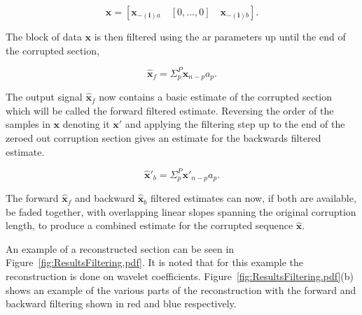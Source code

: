 \begin{equation}\label{eq:RestBasicModelFilterZeros}
\boldsymbol{x} = \left[ \boldsymbol{x}_{\boldsymbol{-(i)}a}\quad \left[0,\ldots,0\right] \quad\boldsymbol{x}_{\boldsymbol{-(i)}b} \right].
\end{equation}

The block of data $\boldsymbol{x}$ is then filtered using the \gls{ar} parameters up until the end of the corrupted section,

\begin{equation}\label{eq:RestBasicModelFilterEQ}
\boldsymbol{\hat{x}}_f = \Sigma_p^P \boldsymbol{x}_{n-p}a_p.
\end{equation}

The output signal $\boldsymbol{\hat{x}}_f$ now contains a basic estimate of the corrupted section which will be called the forward filtered estimate. Reversing the order of the samples in $\boldsymbol{x}$ denoting it $\boldsymbol{x'}$ and applying the filtering step up to the end of the zeroed out corruption section gives an estimate for the backwards filtered estimate.

\begin{equation}\label{eq:RestBasicModelFilterEQR}
\boldsymbol{\hat{x}'}_b = \Sigma_p^P \boldsymbol{x'}_{n-p}a_p.
\end{equation}

The forward $\boldsymbol{\hat{x}}_f$ and backward $\boldsymbol{\hat{x}}_b$ filtered estimates can now, if both are available, be faded together, with overlapping linear slopes spanning the original corruption length, to produce a combined estimate for the corrupted sequence $\boldsymbol{\hat{x}}$.

An example of a reconstructed section can be seen in Figure~\ref{fig:ResultsFiltering.pdf}. It is noted that for this example the reconstruction is done on wavelet coefficients. Figure~\ref{fig:ResultsFiltering.pdf}(b) shows an example of the various parts of the reconstruction with the forward and backward filtering shown in red and blue respectively.

